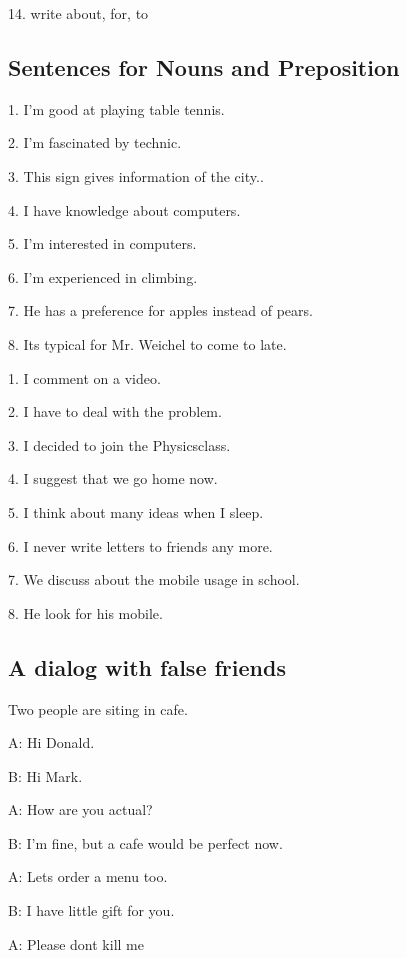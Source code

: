 \documentclass[11pt, oneside]{article}
\begin{document}
14. write about, for, to
\pagebreak

\subsection{Sentences for Nouns and Preposition}

1. I'm good at playing table tennis.

2. I'm fascinated by technic.

3. This sign gives information of the city..

4. I have knowledge about computers.

5. I'm interested in computers.

6. I'm experienced in climbing.

7. He has a preference for apples instead of pears.

8. Its typical for Mr. Weichel to come to late.



1. I comment on a video.

2. I have to deal with the problem.

3. I decided  to join the Physicsclass.

4. I suggest that we go home now.	

5. I think about many ideas when I sleep.

6. I never write letters to friends any more.

7. We discuss about the mobile usage in school.

8. He look for his mobile.

\pagebreak

\subsection{A dialog with false friends}

Two people are siting in cafe.

A: Hi Donald.

B: Hi Mark. 

A: How are you actual?

B: I'm fine, but a cafe would be perfect now.

A: Lets order a menu too.

B: I have little gift for you.

A: Please dont kill me
\end{document}
